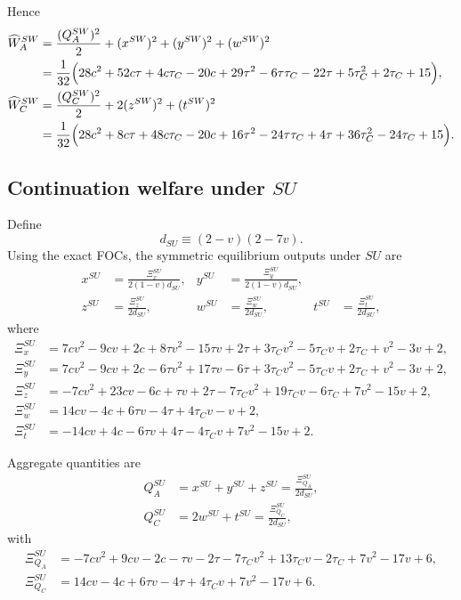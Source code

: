 Hence
\begin{align}
\widehat W_A^{SW}
&= \frac{(Q_A^{SW})^2}{2} + (x^{SW})^2+(y^{SW})^2+(w^{SW})^2 \notag\\
&= \frac{1}{32}\Big(
28c^2+52c\tau+4c\tau_C-20c
+29\tau^2-6\tau\tau_C-22\tau
+5\tau_C^2+2\tau_C+15
\Big), \label{eq:WA_sw_appendix}
\\
\widehat W_C^{SW}
&= \frac{(Q_C^{SW})^2}{2} + 2(z^{SW})^2+(t^{SW})^2 \notag\\
&= \frac{1}{32}\Big(
28c^2+8c\tau+48c\tau_C-20c
+16\tau^2-24\tau\tau_C+4\tau
+36\tau_C^2-24\tau_C+15
\Big). \label{eq:WC_sw_appendix}
\end{align}

\subsection{Continuation welfare under \texorpdfstring{$SU$}{SU}}

Define
\[
d_{SU}\equiv (2-v)(2-7v).
\]
Using the exact FOCs, the symmetric equilibrium outputs under $SU$ are
\begin{align}
x^{SU} &= \frac{\Xi_x^{SU}}{2(1-v)d_{SU}}, &
y^{SU} &= \frac{\Xi_y^{SU}}{2(1-v)d_{SU}}, \label{eq:su_outputs1_appendix}\\
z^{SU} &= \frac{\Xi_z^{SU}}{2d_{SU}}, &
w^{SU} &= \frac{\Xi_w^{SU}}{2d_{SU}}, &
t^{SU} &= \frac{\Xi_t^{SU}}{2d_{SU}}, \label{eq:su_outputs2_appendix}
\end{align}
where
\begin{align}
\Xi_x^{SU}
&= 7cv^2-9cv+2c
+8\tau v^2-15\tau v+2\tau
+3\tau_C v^2-5\tau_C v+2\tau_C
+v^2-3v+2, \label{eq:Xix_su}\\
\Xi_y^{SU}
&= 7cv^2-9cv+2c
-6\tau v^2+17\tau v-6\tau
+3\tau_C v^2-5\tau_C v+2\tau_C
+v^2-3v+2, \label{eq:Xiy_su}\\
\Xi_z^{SU}
&= -7cv^2+23cv-6c
+\tau v+2\tau
-7\tau_C v^2+19\tau_C v-6\tau_C
+7v^2-15v+2, \label{eq:Xiz_su}\\
\Xi_w^{SU}
&= 14cv-4c+6\tau v-4\tau+4\tau_C v-v+2, \label{eq:Xiw_su}\\
\Xi_t^{SU}
&= -14cv+4c-6\tau v+4\tau-4\tau_C v+7v^2-15v+2. \label{eq:Xit_su}
\end{align}

Aggregate quantities are
\begin{align}
Q_A^{SU}
&= x^{SU}+y^{SU}+z^{SU}
= \frac{\Xi_{Q_A}^{SU}}{2d_{SU}}, \label{eq:QA_su_appendix}\\
Q_C^{SU}
&= 2w^{SU}+t^{SU}
= \frac{\Xi_{Q_C}^{SU}}{2d_{SU}}, \label{eq:QC_su_appendix}
\end{align}
with
\begin{align}
\Xi_{Q_A}^{SU}
&= -7cv^2+9cv-2c
-\tau v-2\tau
-7\tau_C v^2+13\tau_C v-2\tau_C
+7v^2-17v+6, \label{eq:XiQA_su}\\
\Xi_{Q_C}^{SU}
&= 14cv-4c+6\tau v-4\tau+4\tau_C v+7v^2-17v+6. \label{eq:XiQC_su}
\end{align}

